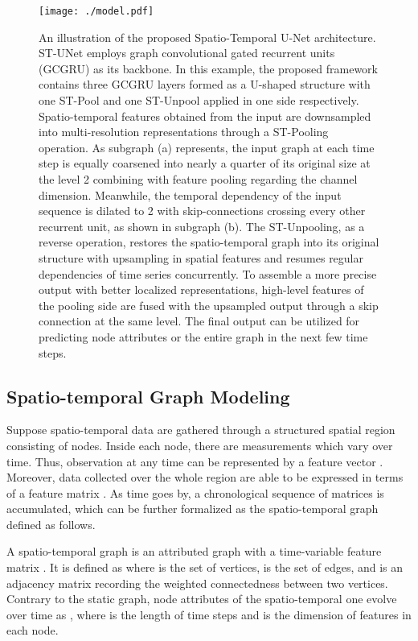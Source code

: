 \documentclass[sigconf,screen]{acmart}
\begin{document}
\begin{figure*}
	\centering
	\texttt{[image: ./model.pdf]}
	\caption{\label{fig:model}An illustration of the proposed Spatio-Temporal U-Net architecture. ST-UNet employs graph convolutional gated recurrent units (GCGRU) as its backbone. In this example, the proposed framework contains three GCGRU layers formed as a U-shaped structure with one ST-Pool and one ST-Unpool applied in one side respectively. Spatio-temporal features obtained from the input are downsampled into multi-resolution representations through a ST-Pooling operation. As subgraph (a) represents, the input graph at each time step is equally coarsened into nearly a quarter of its original size at the level 2 combining with feature pooling regarding the channel dimension. Meanwhile, the temporal dependency of the input sequence is dilated to 2 with skip-connections crossing every other recurrent unit, as shown in subgraph (b). The ST-Unpooling, as a reverse operation, restores the spatio-temporal graph into its original structure with upsampling in spatial features and resumes regular dependencies of time series concurrently. To assemble a more precise output with better localized representations, high-level features of the pooling side are fused with the upsampled output through a skip connection at the same level. The final output can be utilized for predicting node attributes or the entire graph in the next few time steps.}
\end{figure*}

\subsection{Spatio-temporal Graph Modeling}
Suppose spatio-temporal data are gathered through a structured spatial region consisting of  nodes. Inside each node, there are  measurements which vary over time. Thus, observation at any time can be represented by a feature vector . Moreover, data collected over the whole region are able to be expressed in terms of a feature matrix . As time goes by, a chronological sequence of matrices  is accumulated, which can be further formalized as the spatio-temporal graph defined as follows.

\begin{definition} 
A spatio-temporal graph is an attributed graph with a time-variable feature matrix . It is defined as  where  is the set of  vertices,  is the set of edges, and  is an adjacency matrix recording the weighted connectedness between two vertices. Contrary to the static graph, node attributes of the spatio-temporal one evolve over time as , where  is the length of time steps and  is the dimension of features in each node.
\end{definition}
\end{document}
